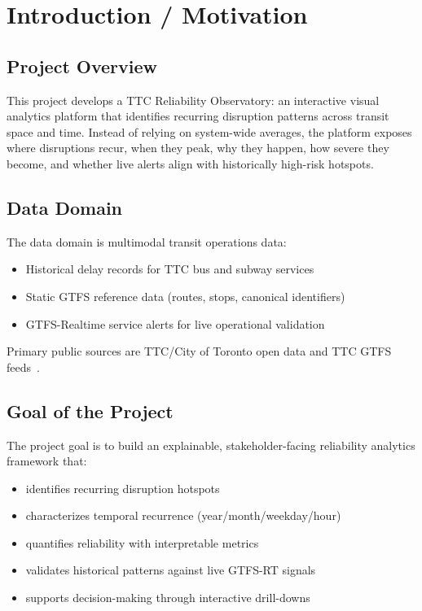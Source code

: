 \documentclass[sigconf]{acmart}
\begin{document}
\section{Introduction / Motivation}

\subsection{Project Overview}
This project develops a TTC Reliability Observatory: an interactive visual analytics platform that identifies recurring disruption patterns across transit space and time. Instead of relying on system-wide averages, the platform exposes where disruptions recur, when they peak, why they happen, how severe they become, and whether live alerts align with historically high-risk hotspots.

\subsection{Data Domain}
The data domain is multimodal transit operations data:
\begin{itemize}
    \item Historical delay records for TTC bus and subway services
    \item Static GTFS reference data (routes, stops, canonical identifiers)
    \item GTFS-Realtime service alerts for live operational validation
\end{itemize}
Primary public sources are TTC/City of Toronto open data and TTC GTFS feeds~\cite{toronto_ttc_bus_delay_data,toronto_ttc_subway_delay_data}.

\subsection{Goal of the Project}
The project goal is to build an explainable, stakeholder-facing reliability analytics framework that:
\begin{itemize}
    \item identifies recurring disruption hotspots
    \item characterizes temporal recurrence (year/month/weekday/hour)
    \item quantifies reliability with interpretable metrics
    \item validates historical patterns against live GTFS-RT signals
    \item supports decision-making through interactive drill-downs
\end{itemize}
\end{document}
